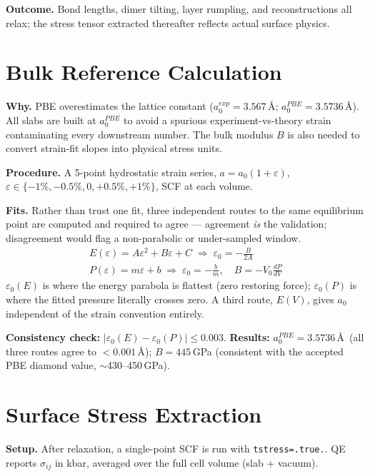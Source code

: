 \documentclass[11pt]{article}
\begin{document}
\textbf{Outcome.} Bond lengths, dimer tilting, layer rumpling, and reconstructions all relax; the stress tensor extracted thereafter reflects actual surface physics.

\section{Bulk Reference Calculation}

\textbf{Why.} PBE overestimates the lattice constant ($a_0^{exp} = 3.567$\,\AA; $a_0^{PBE} = 3.5736$\,\AA). All slabs are built at $a_0^{PBE}$ to avoid a spurious experiment-vs-theory strain contaminating every downstream number. The bulk modulus $B$ is also needed to convert strain-fit slopes into physical stress units.

\textbf{Procedure.} A 5-point hydrostatic strain series, $a = a_0(1+\varepsilon)$, $\varepsilon \in \{-1\%, -0.5\%, 0, +0.5\%, +1\%\}$, SCF at each volume.

\textbf{Fits.} Rather than trust one fit, three independent routes to the same equilibrium point are computed and required to agree --- agreement \textit{is} the validation; disagreement would flag a non-parabolic or under-sampled window.
\begin{align}
E(\varepsilon) = A\varepsilon^2 + B\varepsilon + C \;\Rightarrow\; \varepsilon_0 = -\frac{B}{2A} \\
P(\varepsilon) = m\varepsilon + b \;\Rightarrow\; \varepsilon_0 = -\frac{b}{m}, \quad B = -V_0\frac{dP}{dV}
\end{align}
$\varepsilon_0(E)$ is where the energy parabola is flattest (zero restoring force); $\varepsilon_0(P)$ is where the fitted pressure literally crosses zero. A third route, $E(V)$, gives $a_0$ independent of the strain convention entirely.

\textbf{Consistency check:} $|\varepsilon_0(E) - \varepsilon_0(P)| \le 0.003$. \textbf{Results:} $a_0^{PBE} = 3.5736$\,\AA\ (all three routes agree to $< 0.001$\,\AA); $B = 445$\,GPa (consistent with the accepted PBE diamond value, $\sim$430--450\,GPa).

\section{Surface Stress Extraction}

\textbf{Setup.} After relaxation, a single-point SCF is run with \texttt{tstress=.true.}. QE reports $\sigma_{ij}$ in kbar, averaged over the full cell volume (slab + vacuum).
\end{document}
